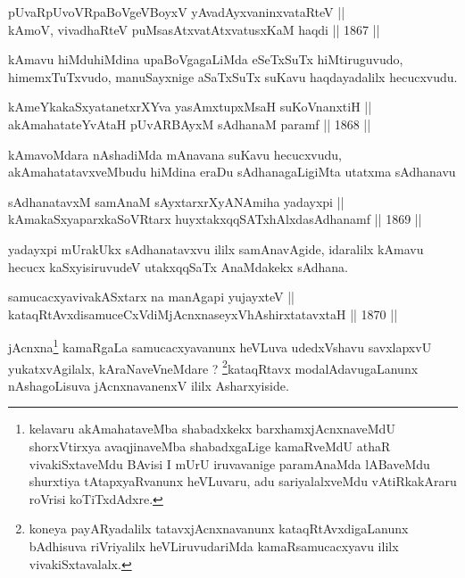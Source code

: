 \begin{shl}
pUvaRpUvoVRpaBoVgeVBoyxV yAvadAyxvaninxvataRteV || \\
kAmoV, vivadhaRteV puMsasAtxvatAtxvatusxKaM haqdi \hfill || 1867 ||
  
\end{shl}

\begin{artha}
kAmavu hiMduhiMdina upaBoVgagaLiMda eSeTxSuTx hiMtiruguvudo,
himemxTuTxvudo, manuSayxnige aSaTxSuTx suKavu haqdayadalilx
hecucxvudu.
\end{artha}

\begin{shl}
kAmeYkakaSxyatanetxrXYva yasAmxtupxMsaH suKoVnanxtiH || \\
akAmahatateYvAtaH pUvARBAyxM sAdhanaM paramf \hfill || 1868 ||
  
\end{shl}

\begin{artha}
kAmavoMdara nAshadiMda mAnavana suKavu hecucxvudu,
akAmahatatavxveMbudu hiMdina eraDu sAdhanagaLigiMta utatxma sAdhanavu 
\end{artha}


\begin{shl}
sAdhanatavxM samAnaM sAyxtarxrXyANAmiha yadayxpi || \\
kAmakaSxyaparxkaSoVR\s tarx huyxtakxqqSATxhAlxdasAdhanamf \hfill || 1869 ||
  
\end{shl}

\begin{artha}
yadayxpi mUrakUkx sAdhanatavxvu ililx samAnavAgide, idaralilx kAmavu
hecucx kaSxyisiruvudeV utakxqqSaTx AnaMdakekx sAdhana.
\end{artha}

\begin{shl}
samucacxyavivakASx\s tarx na manAgapi yujayxteV || \\
kataqRtAvxdisamuceCxVdiMjAcnxnaseyxVhA\s \s shirxtatavxtaH \hfill || 1870 ||
  
\end{shl}

\begin{artha}
jAcnxna\footnote[1]{kelavaru akAmahataveMba shabadxkekx
barxhamxjAcnxnaveMdU shorxVtirxya avaqjinaveMba shabadxgaLige
kamaRveMdU athaR vivakiSxtaveMdu BAvisi I mUrU iruvavanige
paramAnaMda lABaveMdu shurxtiya tAtapxyaRvanunx heVLuvaru, adu
sariyalalxveMdu vAtiRkakAraru roVrisi koTiTxdAdxre.} kamaRgaLa samucacxyavanunx heVLuva udedxVshavu savxlapxvU
yukatxvAgilalx, kAraNaveVneMdare ? \footnote[2]{koneya payARyadalilx
tatavxjAcnxnavanunx kataqRtAvxdigaLanunx bAdhisuva riVriyalilx
heVLiruvudariMda kamaRsamucacxyavu ililx vivakiSxtavalalx.}kataqRtavx
modalAdavugaLanunx nAshagoLisuva jAcnxnavanenxV ililx Asharxyiside.
\end{artha}

